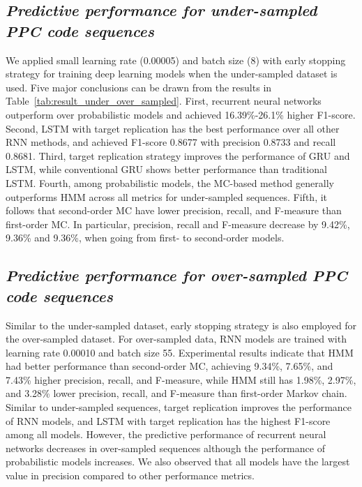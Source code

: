 \documentclass{amia_summit_2018}
\begin{document}
\subsection*{\textit{Predictive performance for under-sampled PPC code sequences}}
We applied small learning rate (0.00005) and batch size (8) with early stopping strategy for training deep learning models when the under-sampled dataset is used. Five major conclusions can be drawn from the results in Table~\ref{tab:result_under_over_sampled}. First, recurrent neural networks outperform over probabilistic models and achieved 16.39\%-26.1\% higher F1-score. Second, LSTM with target replication has the best performance over all other RNN methods, and achieved F1-score 0.8677 with precision 0.8733 and recall 0.8681. Third, target replication strategy improves the performance of GRU and LSTM, while conventional GRU shows better performance than traditional LSTM. Fourth, among probabilistic models, the MC-based method generally outperforms HMM across all metrics for under-sampled sequences. Fifth, it follows that second-order MC have lower precision, recall, and F-measure than first-order MC. In particular, precision, recall and F-measure decrease by 9.42\%, 9.36\% and 9.36\%, when going from first- to second-order models.

\subsection*{\textit{Predictive performance for over-sampled PPC code sequences}}
Similar to the under-sampled dataset, early stopping strategy is also employed for the over-sampled dataset. For over-sampled data, RNN models are trained with learning rate 0.00010 and batch size 55. Experimental results indicate that HMM had better performance than second-order MC, achieving 9.34\%, 7.65\%, and 7.43\% higher precision, recall, and F-measure, while HMM still has 1.98\%, 2.97\%, and 3.28\% lower precision, recall, and F-measure than first-order Markov chain. Similar to under-sampled sequences, target replication improves the performance of RNN models, and LSTM with target replication has the highest F1-score among all models. However, the predictive performance of recurrent neural networks decreases in over-sampled sequences although the performance of probabilistic models increases. We also observed that all models have the largest value in precision compared to other performance metrics.
\end{document}
